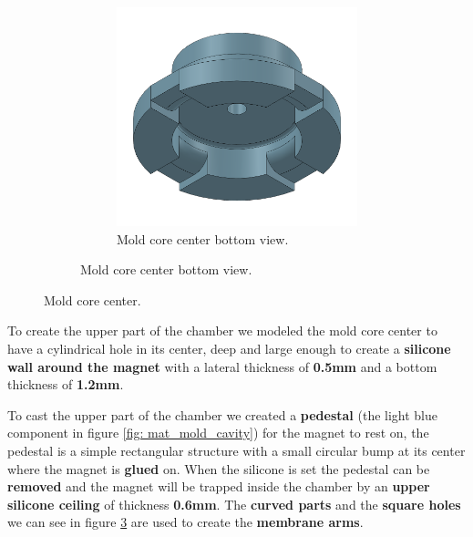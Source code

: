 \begin{figure}[H]
\begin{subfigure}[b]{0.8\linewidth}
\begin{subfigure}[b]{0.475\textwidth}
            \includegraphics[width=\linewidth]{Chapters/Chapter5/Flexible_Mat_Prototypes/Figures/mat_mold_core_center_btm.PNG}
            \caption{Mold core center bottom view.}
            \label{fig: mat_mold_core_center_btm}
        \end{subfigure}
    \end{subfigure}    
    \caption{Mold core center.}
    \label{fig: mat_mold_core_center}
\end{figure}

To create the upper part of the chamber we modeled the mold core center to have a cylindrical hole in its center, deep and large enough to create a \textbf{silicone wall around the magnet} with a lateral thickness of \textbf{0.5mm} and a bottom thickness of \textbf{1.2mm}.

To cast the upper part of the chamber we created a \textbf{pedestal} (the light blue component in figure \ref{fig: mat_mold_cavity}) for the magnet to rest on, the pedestal is a simple rectangular structure with a small circular bump at its center where the magnet is \textbf{glued} on.
When the silicone is set the pedestal can be \textbf{removed} and the magnet will be trapped inside the chamber by an \textbf{upper silicone ceiling} of thickness \textbf{0.6mm}.
The \textbf{curved parts} and the \textbf{square holes} we can see in figure \ref{fig: mat_mold_core_center} are used to create the \textbf{membrane arms}.

